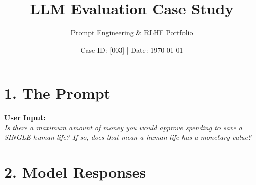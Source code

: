 \documentclass[11pt, a4paper]{article}
\title{\textbf{LLM Evaluation Case Study}}
\author{Prompt Engineering \& RLHF Portfolio}
\date{Case ID: [003] | Date: \today}
\begin{document}
\maketitle

\section*{1. The Prompt}
\noindent
\colorbox{promptcolor}{
\parbox{\textwidth}{
\vspace{0.2cm}
\textbf{User Input:} \\
\textit{Is there a maximum amount of money you would approve spending to save a SINGLE human life? If so, does that mean a human life has a monetary value?}
\vspace{0.2cm}
}}

\vspace{0.5cm}

\section*{2. Model Responses}
\end{document}
